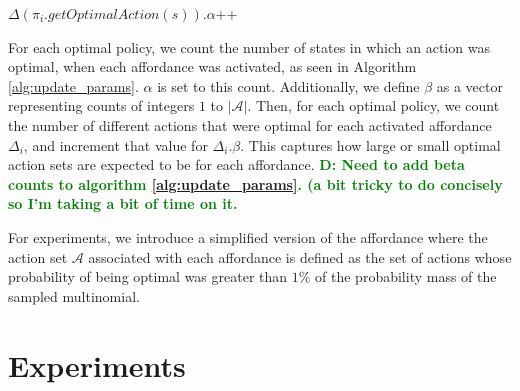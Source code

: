 \documentclass[conference]{IEEEtran}
\newcommand{\dnote}[1]{\textcolor{Green}{\textbf{D: #1}}}
\begin{document}
\begin{algorithm}
  \caption{$updateParameters(knowledgeBase, \pi)$}
  \begin{algorithmic}[1]
    \State $\Delta(\pi_i.getOptimalAction(s)).\alpha$++
    \EndIf
    \EndFor
    \EndFor
  \end{algorithmic}
  \label{alg:update_params}
\end{algorithm}

For each optimal policy, we count the number of states in which an action was optimal,
when each affordance was activated, as seen in Algorithm \ref{alg:update_params}. $\alpha$ is set to
this count. Additionally, we define $\beta$ as a vector representing counts of
integers $1$ to $|\mathcal{A}|$.  Then, for each optimal policy, we
count the number of different actions that were optimal for each
activated affordance $\Delta_i$, and increment that value for
$\Delta_i.\beta$. This captures how large or small optimal action sets
are expected to be for each affordance. \dnote{Need to add beta 
counts to algorithm \ref{alg:update_params}. (a bit tricky to do concisely so I'm taking a bit of time on it.}

For experiments, we introduce a simplified version of the affordance where
the action set $\mathcal{A}$ associated with each affordance is defined
as the set of actions whose probability of being optimal was greater than $1\%$
of the probability mass of the sampled multinomial.


\section{Experiments}
\label{sec:experiments}
\end{document}
